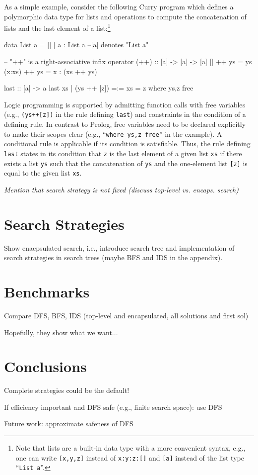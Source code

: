 \documentclass[english]{lni}
\newcommand{\code}[1]{\texttt{#1}}
\newcommand{\ccode}[1]{``\code{#1}''}
\begin{document}
As a simple example, consider the following Curry program
which defines a polymorphic 
data type for lists and operations to compute the 
concatenation of lists and the last element of a list:\footnote{Note
that lists are a built-in data type with a more convenient syntax, 
e.g., one can write \code{[x,y,z]} instead of \code{x:y:z:[]}
and \code{[a]} instead of the list type \ccode{List a}.}
%
\begin{curry}
  data List a = [] | a : List a    --[a] denotes "List a"

  -- "++" is a right-associative infix operator
  (++) :: [a] -> [a] -> [a]
  []     ++ ys = ys
  (x:xs) ++ ys = x : (xs ++ ys)

  last :: [a] -> a
  last xs | (ys ++ [z]) =:= xs
          = z                    where ys,z free
\end{curry}
%
Logic programming is supported by admitting function calls with free
variables (e.g., \code{(ys++[z])} in the rule defining \code{last})
and constraints in the condition of a defining rule. In contrast to
Prolog, free variables need to be declared explicitly to make their
scopes clear (e.g., \ccode{where ys,z free} in the example).
A conditional rule is applicable if its condition  is satisfiable.
Thus, the rule defining \code{last} states in its condition
that \code{z} is the last element of a given list
\code{xs} if there exists a list \code{ys}
such that the concatenation of \code{ys} and the one-element list
\code{[z]} is equal to the given list \code{xs}.



{\it
Mention that search strategy is not fixed
 (discuss top-level vs. encaps. search)}

\section{Search Strategies}
\label{sec:strategies}

Show enacpsulated search, i.e., introduce search tree
and implementation of search strategies in search trees
(maybe BFS and IDS in the appendix).

\section{Benchmarks}
\label{sec:benchmarks}

Compare DFS, BFS, IDS (top-level and encapsulated, all solutions and first sol)

Hopefully, they show what we want...

\section{Conclusions}
\label{sec:conclusions}

Complete strategies could be the default!

If efficiency important and DFS safe (e.g., finite search space): use DFS

Future work: approximate safeness of DFS



%
\end{document}
